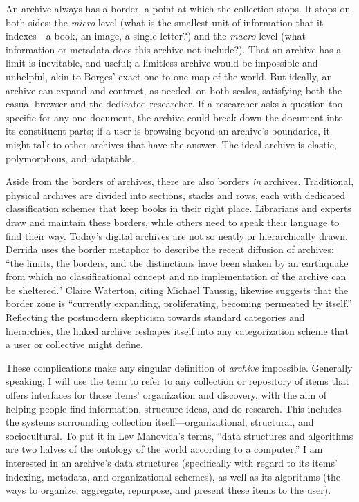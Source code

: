 An archive always has a border, a point at which the collection stops. It stops on both sides: the \emph{micro} level (what is the smallest unit of information that it indexes---a book, an image, a single letter?) and the \emph{macro} level (what information or metadata does this archive not include?). That an archive has a limit is inevitable, and useful; a limitless archive would be impossible and unhelpful, akin to Borges' exact one-to-one map of the world.\autocite[325]{borges_collected_1999} But ideally, an archive can expand and contract, as needed, on both scales, satisfying both the casual browser and the dedicated researcher. If a researcher asks a question too specific for any one document, the archive could break down the document into its constituent parts; if a user is browsing beyond an archive's boundaries, it might talk to other archives that have the answer. The ideal archive is elastic, polymorphous, and adaptable.

Aside from the borders of archives, there are also borders \emph{in} archives. Traditional, physical archives are divided into sections, stacks and rows, each with dedicated classification schemes that keep books in their right place. Librarians and experts draw and maintain these borders, while others need to speak their language to find their way. Today's digital archives are not so neatly or hierarchically drawn. Derrida uses the border metaphor to describe the recent diffusion of archives: ``the limits, the borders, and the distinctions have been shaken by an earthquake from which no classificational concept and no implementation of the archive can be sheltered.''\autocite[11]{derrida_archive_1995} Claire Waterton, citing Michael Taussig, likewise suggests that the border zone is ``currently expanding, proliferating, becoming permeated by itself.''\autocite[649]{waterton_experimenting_2010} Reflecting the postmodern skepticism towards standard categories and hierarchies, the linked archive reshapes itself into any categorization scheme that a user or collective might define.

These complications make any singular definition of \emph{archive} impossible. Generally speaking, I will use the term to refer to any collection or repository of items that offers interfaces for those items' organization and discovery, with the aim of helping people find information, structure ideas, and do research. This includes the systems surrounding collection itself---organizational, structural, and sociocultural. To put it in Lev Manovich's terms, ``data structures and algorithms are two halves of the ontology of the world according to a computer.''\autocite[84]{manovich_database_1999} I am interested in an archive's data structures (specifically with regard to its items' indexing, metadata, and organizational schemes), as well as its algorithms (the ways to organize, aggregate, repurpose, and present these items to the user).

